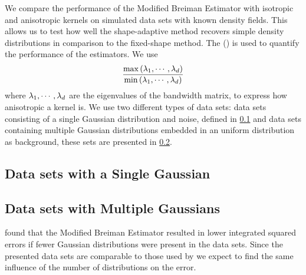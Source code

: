 We compare the performance of the Modified Breiman Estimator with isotropic and anisotropic kernels on simulated data sets with known density fields. This allows us to test how well the shape-adaptive method recovers simple density distributions in comparison to the fixed-shape method. 
The \mse (\MSE) is used to quantify the performance of the estimators. We use
\begin{equation*}\label{eq:experiment:anisotropicmetric}
	\frac{\max\left(\lambda_1, \cdots, \lambda_d \right)}{\min\left(\lambda_1, \cdots, \lambda_d \right)}
\end{equation*}
where $\lambda_1, \cdots, \lambda_d$ are the eigenvalues of the bandwidth matrix, to express how anisotropic a kernel is.
We use two different types of data sets: data sets consisting of a single Gaussian distribution and noise, defined in \cref{s:experiment:singlesphere} and data sets containing multiple Gaussian distributions embedded in an uniform distribution as background, these sets are presented in \cref{s:experiment:multisphere}.

\subsection{Data sets with a Single Gaussian}
\label{s:experiment:singlesphere}


\subsection{Data sets with Multiple Gaussians}
\label{s:experiment:multisphere}


\textcite{ferdosi2011comparison} found that the Modified Breiman Estimator resulted in lower integrated squared errors if fewer Gaussian distributions were present in the data sets. Since the presented data sets are comparable to those used by \citeauthor{ferdosi2011comparison} we expect to find the same influence of the number of distributions on the error.
